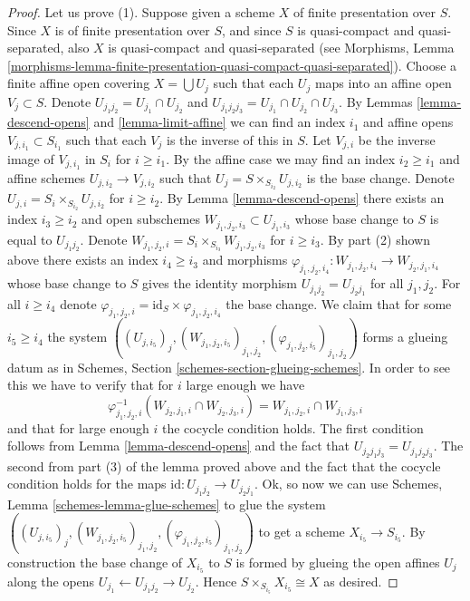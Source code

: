 \documentclass{stacks-project}
\theoremstyle{plain}
\theoremstyle{definition}
\theoremstyle{remark}
\numberwithin{equation}{subsection}
\begin{document}
\begin{proof}
\medskip\noindent
Let us prove (1). Suppose given a scheme $X$ of finite presentation
over $S$. Since $X$ is of finite presentation
over $S$, and since $S$ is quasi-compact and quasi-separated, also
$X$ is quasi-compact and quasi-separated
(see Morphisms,
Lemma \ref{morphisms-lemma-finite-presentation-quasi-compact-quasi-separated}).
Choose a finite affine open covering $X = \bigcup U_j$
such that each $U_j$ maps into an affine open $V_j \subset S$.
Denote $U_{j_1j_2} = U_{j_1} \cap U_{j_2}$ and
$U_{j_1j_2j_3} = U_{j_1} \cap U_{j_2} \cap U_{j_3}$.
By Lemmas \ref{lemma-descend-opens} and \ref{lemma-limit-affine}
we can find an index $i_1$ and affine opens $V_{j, i_1} \subset S_{i_1}$
such that each $V_j$ is the inverse of this in $S$.
Let $V_{j, i}$ be the inverse image of $V_{j, i_1}$ in $S_i$ for
$i \geq i_1$. By the affine case we may find an index $i_2 \geq i_1$ and
affine schemes $U_{j, i_2} \to V_{j, i_2}$ such
that $U_j = S \times_{S_{i_2}} U_{j, i_2}$ is the base change.
Denote $U_{j, i} = S_i \times_{S_{i_2}} U_{j, i_2}$ for $i \geq i_2$.
By Lemma \ref{lemma-descend-opens} there exists an index
$i_3 \geq i_2$ and open subschemes
$W_{j_1, j_2, i_3} \subset U_{j_1, i_3}$
whose base change to $S$ is equal to $U_{j_1j_2}$.
Denote $W_{j_1, j_2, i} = S_i \times_{S_{i_3}} W_{j_1, j_2, i_3}$
for $i \geq i_3$. By part (2) shown above there exists an index
$i_4 \geq i_3$ and morphisms
$\varphi_{j_1, j_2, i_4} : W_{j_1, j_2, i_4} \to W_{j_2, j_1, i_4}$
whose base change to $S$ gives the identity morphism
$U_{j_1j_2} = U_{j_2j_1}$ for all $j_1, j_2$.
For all $i \geq i_4$ denote
$\varphi_{j_1, j_2, i} = \text{id}_S \times \varphi_{j_1, j_2, i_4}$
the base change. We claim that for some $i_5 \geq i_4$ the system
$((U_{j, i_5})_j, (W_{j_1, j_2, i_5})_{j_1, j_2},
(\varphi_{j_1, j_2, i_5})_{j_1, j_2})$ forms a glueing datum
as in Schemes, Section \ref{schemes-section-glueing-schemes}.
In order to see this we have to verify that for $i$ large enough
we have
$$
\varphi_{j_1, j_2, i}^{-1}(W_{j_2, j_1, i} \cap W_{j_2, j_3, i})
=
W_{j_1, j_2, i} \cap W_{j_1, j_3, i}
$$
and that for large enough $i$ the cocycle condition holds.
The first condition follows from Lemma \ref{lemma-descend-opens}
and the fact that $U_{j_2j_1j_3} = U_{j_1j_2j_3}$.
The second from part (3) of the lemma proved above and the fact
that the cocycle condition holds for the maps
$\text{id} : U_{j_1j_2} \to U_{j_2j_1}$.
Ok, so now we can use Schemes, Lemma \ref{schemes-lemma-glue-schemes}
to glue the system
$((U_{j, i_5})_j, (W_{j_1, j_2, i_5})_{j_1, j_2},
(\varphi_{j_1, j_2, i_5})_{j_1, j_2})$ to get a scheme
$X_{i_5} \to S_{i_5}$. By construction the base change of
$X_{i_5}$ to $S$ is formed by glueing the open affines
$U_j$ along the opens $U_{j_1} \leftarrow U_{j_1j_2} \rightarrow U_{j_2}$.
Hence $S \times_{S_{i_5}} X_{i_5} \cong X$ as desired.
\end{proof}
\end{document}
